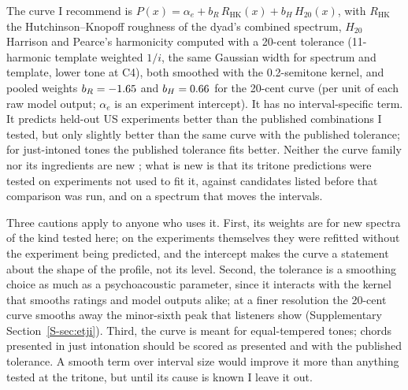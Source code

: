\documentclass[11pt,a4paper]{article}
\begin{document}
The curve I recommend is
$P(x)=\alpha_e+b_R\,R_{\mathrm{HK}}(x)+b_H\,H_{20}(x)$, with $R_{\mathrm{HK}}$ the
Hutchinson--Knopoff roughness of the dyad's combined spectrum, $H_{20}$ Harrison and Pearce's
harmonicity computed with a 20-cent tolerance (11-harmonic template weighted $1/i$, the same
Gaussian width for spectrum and template, lower tone at C4), both smoothed with the
0.2-semitone kernel, and pooled weights $b_R=-{}1.65$ and $b_H=0.66$ for the 20-cent
curve (per unit of each raw model output; $\alpha_e$ is an experiment intercept). It has no
interval-specific term. It predicts held-out US experiments better than the published
combinations I tested, but only slightly better than the same curve with the published
tolerance; for just-intoned tones the published tolerance fits better. Neither the curve
family nor its ingredients are new \citep{parncutt2019,harrison2020,marjieh2024,masina2022};
what is new is that its tritone predictions were tested on experiments not used to fit it,
against candidates listed before that comparison was run, and on a spectrum that moves the intervals.

Three cautions apply to anyone who uses it. First, its weights are for new spectra of the kind
tested here; on the experiments themselves they were refitted without the experiment being
predicted, and the intercept makes the curve a statement about the shape of the profile, not
its level. Second, the tolerance is a smoothing choice as much as a psychoacoustic parameter,
since it interacts with the kernel that smooths ratings and model outputs alike; at a finer
resolution the 20-cent curve smooths away the minor-sixth peak that listeners show
(Supplementary Section~\ref{S-sec:etji}). Third, the
curve is meant for equal-tempered tones; chords presented in just intonation should be scored
as presented and with the published tolerance. A smooth term over interval size would improve
it more than anything tested at the tritone, but until its cause is known I leave it out.
\end{document}
